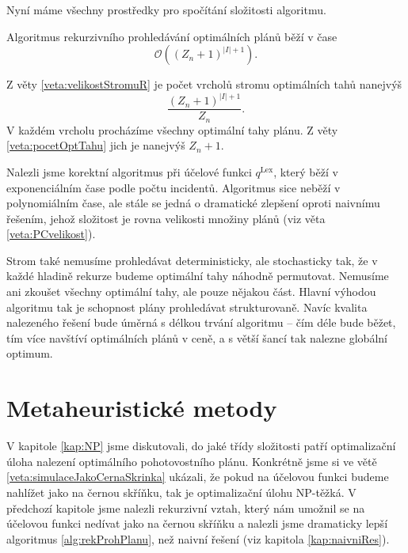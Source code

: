Nyní máme všechny prostředky pro spočítání složitosti algoritmu.
\begin{veta}\label{veta:slozitostRek}
  Algoritmus rekurzivního prohledávání optimálních plánů běží v čase
  \begin{equation*}
    \mathcal{O}((Z_n + 1)^{|I| + 1}).
  \end{equation*}
\end{veta}
\begin{dukaz}
  Z věty \ref{veta:velikostStromuR} je počet vrcholů stromu optimálních tahů nanejvýš
  \begin{equation*}
    \frac{(Z_n + 1)^{|I| + 1}}{Z_n}.
  \end{equation*}
  V každém vrcholu procházíme všechny optimální tahy plánu. Z věty \ref{veta:pocetOptTahu} jich je nanejvýš $Z_n + 1$.
\end{dukaz}

Nalezli jsme korektní algoritmus při účelové funkci $q^{\text{Lex}}$, který běží v exponenciálním čase podle počtu incidentů. 
Algoritmus sice neběží v polynomiálním čase, ale stále se jedná o dramatické zlepšení oproti naivnímu řešením, jehož složitost je rovna velikosti množiny plánů (viz věta \ref{veta:PCvelikost}).

Strom také nemusíme prohledávat deterministicky, ale stochasticky tak, že v každé hladině rekurze budeme optimální tahy náhodně permutovat. Nemusíme ani zkoušet všechny optimální tahy,
ale pouze nějakou část. Hlavní výhodou algoritmu tak je schopnost plány prohledávat strukturovaně. Navíc kvalita nalezeného řešení bude úměrná s délkou trvání algoritmu
-- čím déle bude běžet, tím více navštíví optimálních plánů v ceně, a s větší šancí tak nalezne globální optimum.

\section{Metaheuristické metody}\label{kap:heuristiky}

V kapitole \ref{kap:NP} jsme diskutovali, do jaké třídy složitosti patří optimalizační úloha nalezení optimálního pohotovostního plánu.
Konkrétně jsme si ve větě \ref{veta:simulaceJakoCernaSkrinka} ukázali, že pokud na účelovou funkci budeme nahlížet jako na černou skříňku,
tak je optimalizační úlohu NP-těžká. V předchozí kapitole jsme nalezli rekurzivní vztah, který nám umožnil se na
účelovou funkci nedívat jako na černou skříňku a nalezli jsme dramaticky lepší algoritmus \ref{alg:rekProhPlanu}, než naivní řešení (viz kapitola \ref{kap:naivniRes}).

